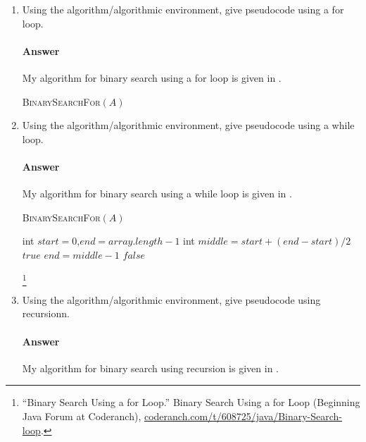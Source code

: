 \documentclass{article}
\begin{document}
\begin{enumerate}
    \item Using the algorithm/algorithmic environment,
        give pseudocode using a for loop.

        \paragraph{Answer} My algorithm for binary search using a for loop is given in .

         \begin{algorithm}
            \caption{\textsc{BinarySearchFor}$(A)$}\label{alg:forloop}
            \begin{algorithmic}
				\State {}
			 \end{algorithmic}
        \end{algorithm}
    \item Using the algorithm/algorithmic environment, give pseudocode using a while loop.

        \paragraph{Answer} My algorithm for binary search using a while loop is given in .

        \begin{algorithm}
            \caption{\textsc{BinarySearchFor}$(A)$}\label{alg:whileloop}
            \begin{algorithmic}
                  \State int $start=0$,$end=array.length-1$
					\State int $middle = start + (end - start)/2$
						\State \Return $true$
						\State $end = middle -1$
					\Else 
					\EndIf
				\EndWhile \State
				\Return $false$
            \end{algorithmic}
        \end{algorithm}
		\footnote{“Binary Search Using a for Loop.” Binary Search Using a for Loop (Beginning Java Forum at Coderanch), \url{coderanch.com/t/608725/java/Binary-Search-loop}.}

    \item Using the algorithm/algorithmic environment, give pseudocode using
        recursionn.

		\paragraph{Answer} My algorithm for binary search using recursion is given in .


\end{enumerate}
\end{document}
